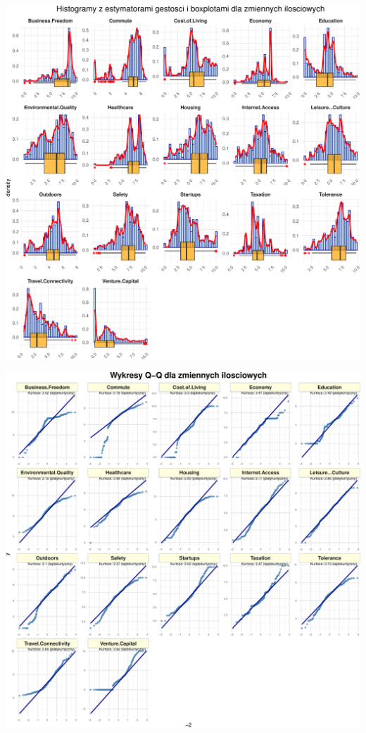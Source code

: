 \documentclass[
  12pt,
]{article}
\begin{document}
\begin{center}\includegraphics{Sprawozdanie2_files/figure-latex/histogramy_ilosciowe1-1} \end{center}

\begin{center}\includegraphics{Sprawozdanie2_files/figure-latex/qq_z_kurtoza-1} \end{center}
\end{document}
